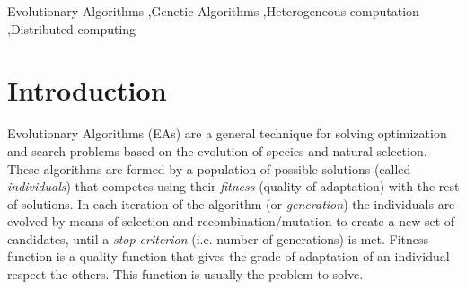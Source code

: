 \documentclass[final,1p,times]{elsarticle}
\begin{document}
\begin{frontmatter}
\begin{abstract}
\end{abstract}

\begin{keyword}
Evolutionary Algorithms \sep Genetic Algorithms \sep Heterogeneous computation \sep Distributed computing
\end{keyword}

\end{frontmatter}

\section{Introduction}
\label{sec:intro}


Evolutionary Algorithms (EAs) are a general technique for solving optimization and search problems based on the evolution of species and natural selection. These algorithms are formed by a population of possible solutions (called {\em individuals}) that competes using their {\em fitness} (quality of adaptation) with the rest of solutions. In each iteration of the algorithm (or {\em generation}) the individuals are evolved by means of selection and recombination/mutation to create a new set of candidates, until a {\em stop criterion} (i.e. number of generations) is met. Fitness function is a quality function that gives the grade of adaptation of an individual respect the others. This function is usually the problem to solve. 

\end{document}
